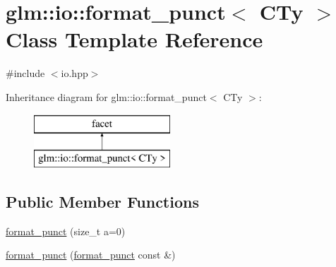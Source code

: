 \hypertarget{classglm_1_1io_1_1format__punct}{}\section{glm\+:\+:io\+:\+:format\+\_\+punct$<$ C\+Ty $>$ Class Template Reference}
\label{classglm_1_1io_1_1format__punct}


{\ttfamily \#include $<$io.\+hpp$>$}

Inheritance diagram for glm\+:\+:io\+:\+:format\+\_\+punct$<$ C\+Ty $>$\+:\begin{figure}[H]
\begin{center}
\leavevmode
\includegraphics[height=2.000000cm]{classglm_1_1io_1_1format__punct}
\end{center}
\end{figure}
\subsection*{Public Member Functions}
\begin{DoxyCompactItemize}
\item 
\hyperlink{classglm_1_1io_1_1format__punct_ae56e7a14fac2516658837281b9da4659}{format\+\_\+punct} (size\+\_\+t a=0)
\item 
\hyperlink{classglm_1_1io_1_1format__punct_a89a8c3cfb0b975f3dd8c0416101c59b7}{format\+\_\+punct} (\hyperlink{classglm_1_1io_1_1format__punct}{format\+\_\+punct} const \&)
\end{DoxyCompactItemize}
